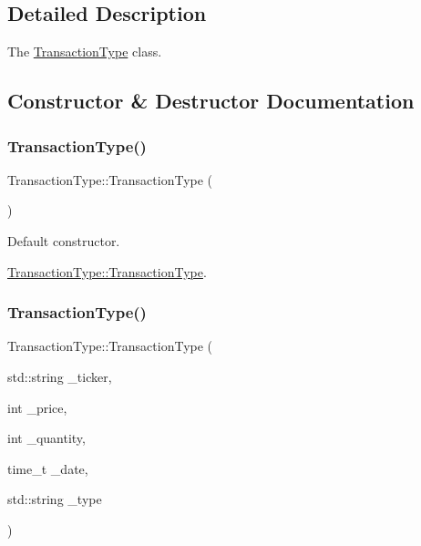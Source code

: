 \subsection{Detailed Description}
The \mbox{\hyperlink{class_transaction_type}{Transaction\+Type}} class. 

\subsection{Constructor \& Destructor Documentation}
\mbox{\label{class_transaction_type_af74ebcedbda4d46f90de333b9268b8a8}} 
\subsubsection{\texorpdfstring{Transaction\+Type()}{TransactionType()}\hspace{0.1cm}{\footnotesize\ttfamily [1/2]}}
{\footnotesize\ttfamily Transaction\+Type\+::\+Transaction\+Type (\begin{DoxyParamCaption}{ }\end{DoxyParamCaption})}



Default constructor. 

\mbox{\hyperlink{class_transaction_type_af74ebcedbda4d46f90de333b9268b8a8}{Transaction\+Type\+::\+Transaction\+Type}}. \mbox{\label{class_transaction_type_a2a4110fc15fd45019d84e42b0fee304b}} 
\subsubsection{\texorpdfstring{Transaction\+Type()}{TransactionType()}\hspace{0.1cm}{\footnotesize\ttfamily [2/2]}}
{\footnotesize\ttfamily Transaction\+Type\+::\+Transaction\+Type (\begin{DoxyParamCaption}\item[{std\+::string}]{\+\_\+ticker,  }\item[{int}]{\+\_\+price,  }\item[{int}]{\+\_\+quantity,  }\item[{time\+\_\+t}]{\+\_\+date,  }\item[{std\+::string}]{\+\_\+type }\end{DoxyParamCaption})}



